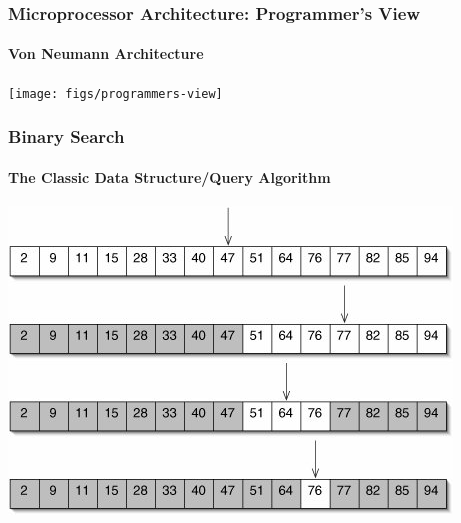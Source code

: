 \documentclass[xcolor=dvipsnames]{beamer}
\begin{document}
\begin{frame}
  \frametitle{Microprocessor Architecture: Programmer's View}
  \framesubtitle{Von Neumann Architecture}

  \begin{center}
    \texttt{[image: figs/programmers-view]} 
  \end{center}
  
  
\end{frame}


\begin{frame}
  \frametitle{Binary Search}
  \framesubtitle{The Classic Data Structure/Query Algorithm}

  \begin{center}
    \includegraphics[width=.9\textwidth]{images/binary-search}
  \end{center}

\end{frame}
\end{document}
